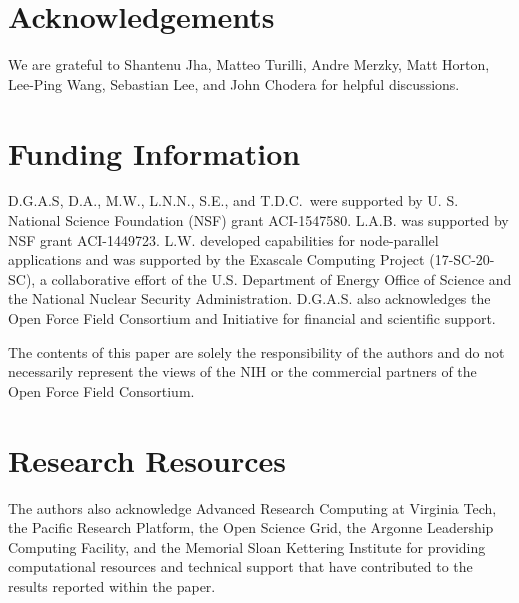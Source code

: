 \documentclass[journal=jctcce,manuscript=article]{achemso}
\begin{document}
\section{Acknowledgements}

We are grateful to Shantenu Jha, Matteo Turilli, Andre Merzky, Matt Horton, Lee-Ping Wang, Sebastian Lee, and John Chodera for helpful discussions.

\section{Funding Information}

D.G.A.S, D.A., M.W., L.N.N., S.E., and T.D.C.\ were supported by U. S. National Science Foundation (NSF) grant ACI-1547580.
L.A.B. was supported by NSF grant ACI-1449723.
L.W. developed capabilities for node-parallel applications and was supported by the Exascale Computing Project (17-SC-20-SC), a collaborative effort of the U.S. Department of Energy Office of Science and the National Nuclear Security Administration.
D.G.A.S. also acknowledges the Open Force Field Consortium and Initiative for financial and scientific support.

The contents of this paper are solely the
responsibility of the authors and do not necessarily represent the views of the NIH or the commercial partners of the Open Force Field Consortium.

\section{Research Resources}

The authors also acknowledge Advanced Research Computing at Virginia Tech, the Pacific Research Platform, the Open Science Grid, the Argonne Leadership Computing Facility, and the Memorial Sloan Kettering Institute for providing computational resources and technical support that have contributed to the results reported within the paper.

 

\end{document}
